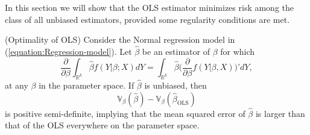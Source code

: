 \documentclass[11pt]{article} %
\begin{document}
In this section we will show that the OLS estimator minimizes risk among the class of all unbiased estimators, provided some regularity conditions are met. 

\begin{proposition}(Optimality of OLS) Consider the Normal regression model in (\ref{equation:Regression-model}). Let $\widehat{\beta}$ be an estimator of $\beta$ for which
\[ \frac{\partial}{\partial \beta} \int_{\mathbb{R}^{k}} \widehat{\beta} f(Y | \beta; X ) dY = \int_{\mathbb{R}^{k}} \widehat{\beta} \Big ( \frac{\partial}{\partial \beta} f(Y | \beta , X) \Big)’ dY,   \]
at any $\beta$ in the parameter space. If $\widehat{\beta}$ is unbiased, then
\[ \mathbb{V}_{\beta} ( \widehat{\beta} ) - \mathbb{V}_{\beta} (\widehat{\beta}_{\textrm{OLS}})  \]
is positive semi-definite, implying that the mean squared error of $\widehat{\beta}$ is larger than that of the OLS everywhere on the parameter space. 
\end{proposition}
 
\end{document}
